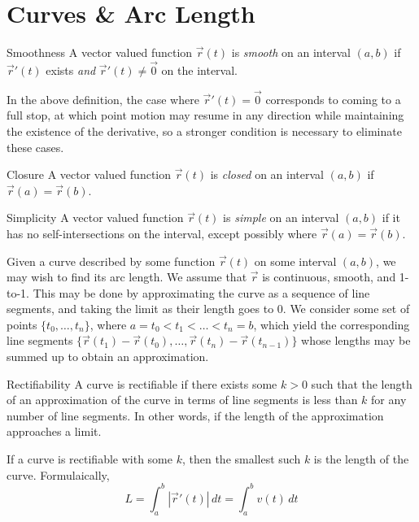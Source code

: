 \documentclass[../main.tex]{subfiles}
\begin{document}
        \section{Curves \& Arc Length}
        \begin{definition}{Smoothness}{}
                A vector valued function \(\vec{r}(t)\) is \emph{smooth} on an interval \((a,b)\) if \(\vec{r}'(t)\) exists \emph{and} \(\vec{r}'(t)\neq\vec{0}\) on the interval.
        \end{definition}
        In the above definition, the case where \(\vec{r}'(t)=\vec{0}\) corresponds to coming to a full stop, at which point motion may resume in any direction while maintaining the existence of the derivative, so a stronger condition is necessary to eliminate these cases.
        \begin{definition}{Closure}{}
                A vector valued function \(\vec{r}(t)\) is \emph{closed} on an interval \((a,b)\) if \(\vec{r}(a)=\vec{r}(b)\).
        \end{definition}
        \begin{definition}{Simplicity}{}
                A vector valued function \(\vec{r}(t)\) is \emph{simple} on an interval \((a,b)\) if it has no self-intersections on the interval, except possibly where \(\vec{r}(a)=\vec{r}(b)\).
        \end{definition}
        Given a curve described by some function \(\vec{r}(t)\) on some interval \((a,b)\), we may wish to find its arc length. We assume that \(\vec{r}\) is continuous, smooth, and 1-to-1. This may be done by approximating the curve as a sequence of line segments, and taking the limit as their length goes to \(0\). We consider some set of points \(\{t_0,\ldots,t_n\}\), where \(a=t_0 < t_1 < \ldots < t_n=b\), which yield the corresponding line segments \(\{\vec{r}(t_1)-\vec{r}(t_0),\ldots,\vec{r}(t_n)-\vec{r}(t_{n-1})\}\) whose lengths may be summed up to obtain an approximation.
        \begin{definition}{Rectifiability}{}
                A curve is rectifiable if there exists some \(k>0\) such that the length of an approximation of the curve in terms of line segments is less than \(k\) for any number of line segments. In other words, if the length of the approximation approaches a limit.
        \end{definition}
        If a curve is rectifiable with some \(k\), then the smallest such \(k\) is the length of the curve. Formulaically,
        \[
        L = \int_a^b \left| \vec{r}'(t) \right|\, dt = \int_a^b v(t)\,dt
        \]
\end{document}
